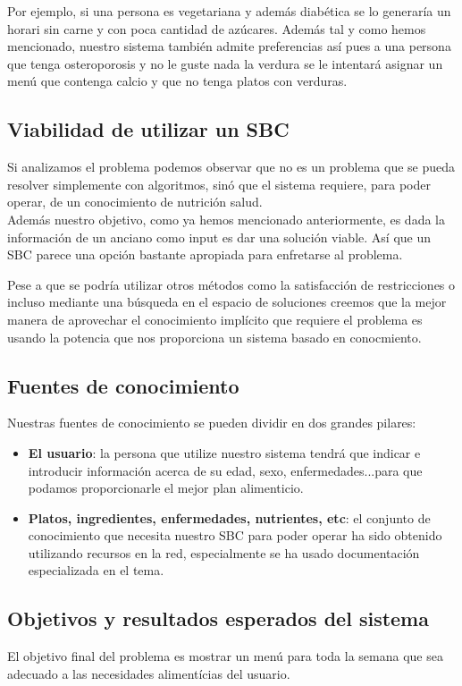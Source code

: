 \documentclass[12]{article}
\begin{document}
Por ejemplo, si una persona es vegetariana y además diabética se lo generaría un horari sin carne y con poca cantidad de azúcares. Además tal y como hemos mencionado, nuestro sistema también admite preferencias así pues a una persona que tenga osteroporosis y no le guste nada la verdura se le intentará asignar un menú que contenga calcio y que no tenga platos con verduras. 

\subsection{Viabilidad de utilizar un SBC}
Si analizamos el problema podemos observar que no es un problema que se pueda resolver simplemente con algoritmos, sinó que el sistema requiere, para poder operar, de un conocimiento de nutrición salud.
\\
Además nuestro objetivo, como ya hemos mencionado anteriormente, es dada la información de un anciano como input es dar una solución viable. Así que un SBC parece una opción bastante apropiada para enfretarse al problema. 
\medskip

Pese a que se podría utilizar otros métodos como la satisfacción de restricciones o incluso mediante una búsqueda en el espacio de soluciones creemos que la mejor manera de aprovechar el conocimiento implícito que requiere el problema es usando la potencia que nos proporciona un sistema basado en conocmiento.

\subsection{Fuentes de conocimiento}

Nuestras fuentes de conocimiento se pueden dividir en dos grandes pilares:
\begin{itemize}
	\item \textbf{El usuario}: la persona que utilize nuestro sistema tendrá que indicar e introducir información acerca de su edad, sexo, enfermedades...para que podamos proporcionarle el mejor plan alimenticio. %
	\item \textbf{Platos, ingredientes, enfermedades, nutrientes, etc}: el conjunto de conocimiento que necesita nuestro SBC para poder operar ha sido obtenido utilizando recursos en la red, especialmente se ha usado documentación especializada en el tema. 
\end{itemize}


\subsection{Objetivos y resultados esperados del sistema}
El objetivo final del problema es mostrar un menú para toda la semana que sea adecuado a las necesidades alimentícias del usuario. 
\medskip
\end{document}
